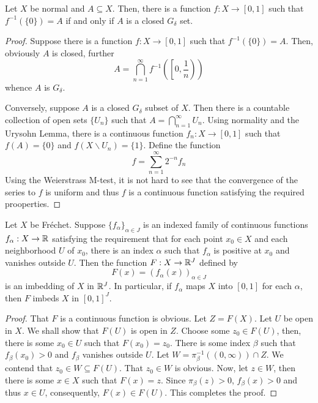 \begin{lemma}
    Let $X$ be normal and $A\subseteq X$. Then, there is a function $f: X\to[0,1]$ such that $f^{-1}(\{0\}) = A$ if and only if $A$ is a closed $G_\delta$ set.
\end{lemma}
\begin{proof}
    Suppose there is a function $f: X\to[0,1]$ such that $f^{-1}(\{0\}) = A$. Then, obviously $A$ is closed, further 
    \begin{equation*}
        A = \bigcap_{n = 1}^\infty f^{-1}\left(\left[0,\frac{1}{n}\right)\right)
    \end{equation*}
    whence $A$ is $G_\delta$.

    Conversely, suppose $A$ is a closed $G_\delta$ subset of $X$. Then there is a countable collection of open sets $\{U_n\}$ such that $A = \bigcap_{n = 1}^\infty U_n$. Using normality and the Urysohn Lemma, there is a continuous function $f_n: X\to[0,1]$ such that $f(A) = \{0\}$ and $f(X\backslash U_n) = \{1\}$. Define the function 
    \begin{equation*}
        f = \sum_{n = 1}^\infty 2^{-n}f_n
    \end{equation*}
    Using the Weierstrass M-test, it is not hard to see that the convergence of the series to $f$ is uniform and thus $f$ is a continuous function satisfying the required prooperties.
\end{proof}

\begin{theorem}
    
\end{theorem}

\begin{theorem}
    Let $X$ be Fr\'echet. Suppose $\{f_\alpha\}_{\alpha\in J}$ is an indexed family of continuous functions $f_\alpha: X\to\mathbb{R}$ satisfying the requirement that for each point $x_0\in X$ and each neighborhood $U$ of $x_0$, there is an index $\alpha$ such that $f_\alpha$ is positive at $x_0$ and vanishes outside $U$. Then the function $F: X\to\mathbb{R}^J$ defined by 
    \begin{equation*}
        F(x) = (f_\alpha(x))_{\alpha\in J}
    \end{equation*}
    is an imbedding of $X$ in $\mathbb{R}^J$. In particular, if $f_\alpha$ maps $X$ into $[0,1]$ for each $\alpha$, then $F$ imbeds $X$ in $[0,1]^J$.
\end{theorem}
\begin{proof}
    That $F$ is a continuous function is obvious. Let $Z = F(X)$. Let $U$ be open in $X$. We shall show that $F(U)$ is open in $Z$. Choose some $z_0\in F(U)$, then, there is some $x_0\in U$ such that $F(x_0) = z_0$. There is some index $\beta$ such that $f_\beta(x_0) > 0$ and $f_\beta$ vanishes outside $U$. Let $W = \pi_\beta^{-1}((0,\infty))\cap Z$. We contend that $z_0\in W\subseteq F(U)$. That $z_0\in W$ is obvious. Now, let $z\in W$, then there is some $x\in X$ such that $F(x) = z$. Since $\pi_\beta(z) > 0$, $f_\beta(x) > 0$ and thus $x\in U$, consequently, $F(x)\in F(U)$. This completes the proof.
\end{proof}

